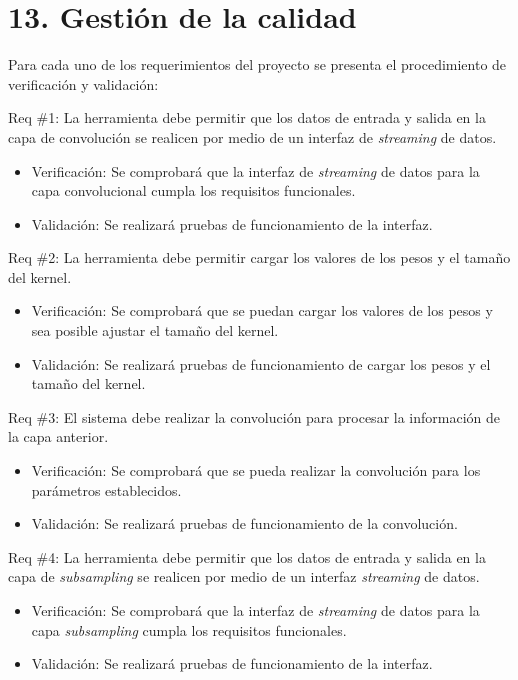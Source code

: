 \documentclass[11pt]{charter}
\begin{document}
\section*{13. Gestión de la calidad}
\label{sec:calidad}

Para cada uno de los requerimientos del proyecto se presenta el procedimiento de verificación y validación: 

Req \#1: La herramienta debe permitir que los datos de entrada y salida en la capa de convolución se realicen por medio de un interfaz de \textit{streaming} de datos.

\begin{itemize}
\item Verificación: Se comprobará que la interfaz de \textit{streaming} de datos para la capa convolucional cumpla los requisitos funcionales. 
\item Validación: Se realizará pruebas de funcionamiento de la interfaz.  
\end{itemize}

Req \#2: La herramienta debe permitir cargar los valores de los pesos y el tamaño del kernel.

\begin{itemize}
\item Verificación: Se comprobará que se puedan cargar los valores de los pesos y sea posible ajustar el tamaño del kernel. 
\item Validación: Se realizará pruebas de funcionamiento de cargar los pesos y el tamaño del kernel.  
\end{itemize}

Req \#3: El sistema debe realizar la convolución para procesar la información de la capa anterior.

\begin{itemize}
\item Verificación: Se comprobará que se pueda realizar la convolución para los parámetros establecidos. 
\item Validación: Se realizará pruebas de funcionamiento de la convolución.  
\end{itemize}

Req \#4: La herramienta debe permitir que los datos de entrada y salida en la capa de \textit{subsampling} se realicen por medio de un interfaz \textit{streaming} de datos.

\begin{itemize}
\item Verificación: Se comprobará que la interfaz de \textit{streaming} de datos para la capa \textit{subsampling} cumpla los requisitos funcionales. 
\item Validación: Se realizará pruebas de funcionamiento de la interfaz.  
\end{itemize}
\end{document}

